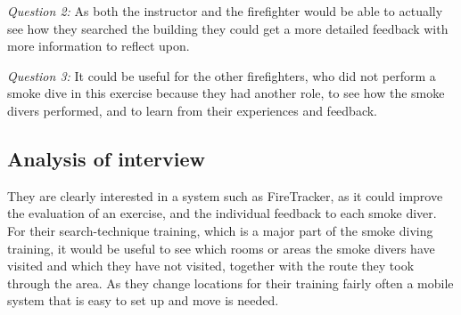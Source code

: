 \documentclass[../Main/thesis.tex]{subfiles}
\begin{document}
\textit{Question 2:}
As both the instructor and the firefighter would be able to actually see how they searched the building they could get a more detailed feedback with more information to reflect upon.

\textit{Question 3:}
It could be useful for the other firefighters, who did not perform a smoke dive in this exercise because they had another role, to see how the smoke divers performed, and to learn from their experiences and feedback.

\subsection{Analysis of interview}
They are clearly interested in a system such as FireTracker, as it could improve the evaluation of an exercise, and the individual feedback to each smoke diver.
For their search-technique training, which is a major part of the smoke diving training, it would be useful to see which rooms or areas the smoke divers have visited and which they have not visited, together with the route they took through the area.
As they change locations for their training fairly often a mobile system that is easy to set up and move is needed.
\end{document}
